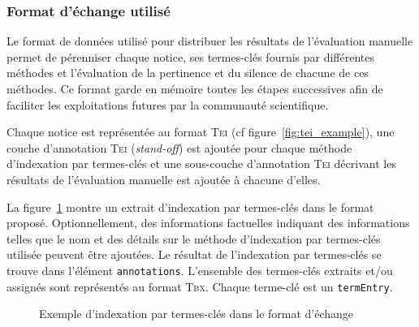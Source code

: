       \subsubsection{Format d'échange utilisé}
      \label{subsubsec:main-automatic_evaluation_of_keyphrase_annotation-methodology-data_format-final_format}
        Le format de données utilisé pour distribuer les résultats de
        l'évaluation manuelle permet de pérenniser chaque notice, ses
        termes-clés fournis par différentes méthodes et l'évaluation de la
        pertinence et du silence de chacune de ces méthodes. Ce format garde en
        mémoire toutes les étapes successives afin de faciliter les
        exploitations futures par la communauté scientifique.

        Chaque notice est représentée au format \textsc{Tei} (cf
        figure~\ref{fig:tei_example}), une couche d'annotation
        \textsc{Tei} (\textit{stand-off}) est ajoutée pour chaque méthode
        d'indexation par termes-clés et une sous-couche d'annotation
        \textsc{Tei} décrivant les résultats de l'évaluation manuelle est
        ajoutée à chacune d'elles.

        La figure~\ref{fig:tei_tbx_keyphrase_example} montre un extrait
        d'indexation par termes-clés dans le format proposé. Optionnellement,
        des informations factuelles indiquant des informations telles que le nom
        et des détails sur le méthode d'indexation par termes-clés utilisée
        peuvent être ajoutées. Le résultat de l'indexation par termes-clés se
        trouve dans l'élément \texttt{annotations}. L'ensemble des termes-clés
        extraits et/ou assignés sont représentés au format \textsc{Tbx}. Chaque
        terme-clé est un \texttt{termEntry}.
        \begin{figure}[h!]
          \lstset{language=XML}
          \lstset{frame=single}
          
          \caption{Exemple d'indexation par termes-clés dans le format d'échange
                   \label{fig:tei_tbx_keyphrase_example}}
        \end{figure}


